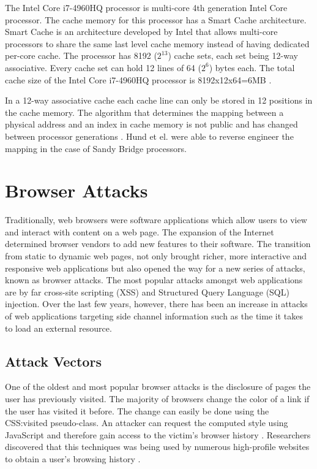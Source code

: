 \documentclass[10pt,a4paper,twoside]{book}
\begin{document}
The Intel Core i7-4960HQ processor is multi-core 4th generation Intel Core processor. The cache memory for this processor has a Smart Cache architecture. Smart Cache is an architecture developed by Intel that allows multi-core processors to share the same last level cache memory instead of having dedicated per-core cache. The processor has 8192 ($2^{13}$) cache sets, each set being 12-way associative. Every cache set can hold 12 lines of  64 ($2^6$) bytes each. The total cache size of the Intel Core i7-4960HQ processor is 8192x12x64=6MB \cite{oren2015spy}.

In a 12-way associative cache each cache line can only be stored in 12 positions in the cache memory. The algorithm that determines the mapping between a physical address and an index in cache memory is not public and has changed between processor generations \cite{oren2015spy}. Hund et el. \cite{hund2013practical} were able to reverse engineer the mapping in the case of Sandy Bridge processors.

\section{Browser Attacks}
\label{tb:browserattacks}
Traditionally, web browsers were software applications which allow users to view and interact with content on a web page. The expansion of the Internet determined browser vendors to add new features to their software. The transition from static to dynamic web pages, not only brought richer, more interactive and responsive web applications but also opened the way for a new series of attacks, known as browser attacks. The most popular attacks amongst web applications are by far cross-site scripting (XSS) and Structured Query Language (SQL) injection. Over the last few years, however, there has been an increase in attacks of web applications targeting side channel information such as the time it takes to load an external resource.

\subsection{Attack Vectors}
One of the oldest and most popular browser attacks is the disclosure of pages the user has previously visited. The majority of browsers change the color of a link if the user has visited it before. The change can easily be done using the CSS:visited pseudo-class. An attacker can request the computed style using JavaScript and therefore gain access to the victim's browser history \cite{cssvisited}. Researchers discovered that this techniques was being used by numerous high-profile websites to obtain a user's browsing history
\cite{jang2010empirical}.
\end{document}
